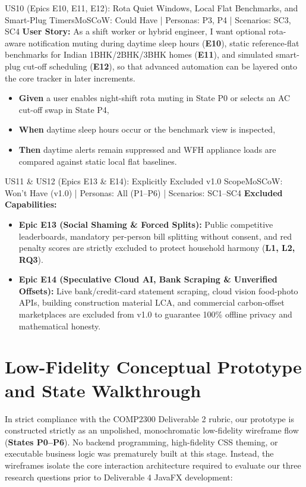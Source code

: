 \documentclass[12pt, a4paper]{article}
\begin{document}
\begin{storybox}{US10 (Epics E10, E11, E12): Rota Quiet Windows, Local Flat Benchmarks, and Smart-Plug Timers}{MoSCoW: Could Have | Personas: P3, P4 | Scenarios: SC3, SC4}
\textbf{User Story:} As a shift worker or hybrid engineer, I want optional rota-aware notification muting during daytime sleep hours (\textbf{E10}), static reference-flat benchmarks for Indian 1BHK/2BHK/3BHK homes (\textbf{E11}), and simulated smart-plug cut-off scheduling (\textbf{E12}), so that advanced automation can be layered onto the core tracker in later increments.
\begin{itemize}
    \item \textbf{Given} a user enables night-shift rota muting in State P0 or selects an AC cut-off swap in State P4,
    \item \textbf{When} daytime sleep hours occur or the benchmark view is inspected,
    \item \textbf{Then} daytime alerts remain suppressed and WFH appliance loads are compared against static local flat baselines.
\end{itemize}
\end{storybox}

\begin{storybox}{US11 \& US12 (Epics E13 \& E14): Explicitly Excluded v1.0 Scope}{MoSCoW: Won't Have (v1.0) | Personas: All (P1--P6) | Scenarios: SC1--SC4}
\textbf{Excluded Capabilities:}
\begin{itemize}
    \item \textbf{Epic E13 (Social Shaming \& Forced Splits):} Public competitive leaderboards, mandatory per-person bill splitting without consent, and red penalty scores are strictly excluded to protect household harmony (\textbf{L1, L2, RQ3}).
    \item \textbf{Epic E14 (Speculative Cloud AI, Bank Scraping \& Unverified Offsets):} Live bank/credit-card statement scraping, cloud vision food-photo APIs, building construction material LCA, and commercial carbon-offset marketplaces are excluded from v1.0 to guarantee 100\% offline privacy and mathematical honesty.
\end{itemize}
\end{storybox}

\clearpage

\section{Low-Fidelity Conceptual Prototype and State Walkthrough}
In strict compliance with the COMP2300 Deliverable 2 rubric, our prototype is constructed strictly as an unpolished, monochromatic low-fidelity wireframe flow (\textbf{States P0--P6}). No backend programming, high-fidelity CSS theming, or executable business logic was prematurely built at this stage. Instead, the wireframes isolate the core interaction architecture required to evaluate our three research questions prior to Deliverable 4 JavaFX development:
\end{document}

